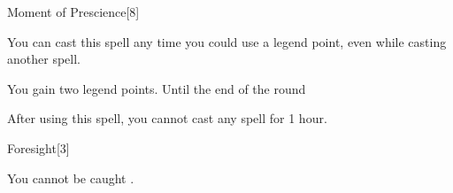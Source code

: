 \begin{spellfooter}
\begin{spellsection}[Greater]{Moment of Prescience}[8]
    \begin{spellheader}
    \end{spellheader}
    \begin{spellcontent}
        \begin{spelltargetinginfo}
            \spellspecial You can cast this spell any time you could use a legend point, even while casting another spell.
        \end{spelltargetinginfo}
        \begin{spelleffects}
            \spelleffect You gain two legend points.
            \spelldur Until the end of the round
        \end{spelleffects}
    \end{spellcontent}
    \begin{spellfooter}
        \spellnotes After using this spell, you cannot cast any  spell for 1 hour.
        \miscastexplode
    \end{spellfooter}
\end{spellsection}

\begin{spellsection}{Foresight}[3]
    \begin{spellheader}
    \end{spellheader}
    \begin{spellcontent}
        \begin{spelleffects}
            \spelleffect You cannot be caught \unaware.
            \spelldur \durlong
        \end{spelleffects}
    \end{spellcontent}
    \begin{spellfooter}
        \miscastexplode
    \end{spellfooter}
\end{spellsection}


\end{spellfooter}
